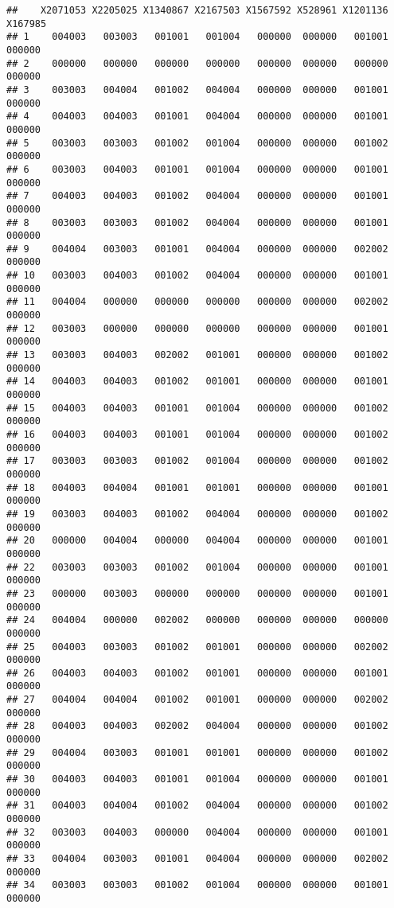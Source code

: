 \documentclass[
]{article}
\begin{document}
\begin{verbatim}
##    X2071053 X2205025 X1340867 X2167503 X1567592 X528961 X1201136 X167985
## 1    004003   003003   001001   001004   000000  000000   001001  000000
## 2    000000   000000   000000   000000   000000  000000   000000  000000
## 3    003003   004004   001002   004004   000000  000000   001001  000000
## 4    004003   004003   001001   004004   000000  000000   001001  000000
## 5    003003   003003   001002   001004   000000  000000   001002  000000
## 6    003003   004003   001001   001004   000000  000000   001001  000000
## 7    004003   004003   001002   004004   000000  000000   001001  000000
## 8    003003   003003   001002   004004   000000  000000   001001  000000
## 9    004004   003003   001001   004004   000000  000000   002002  000000
## 10   003003   004003   001002   004004   000000  000000   001001  000000
## 11   004004   000000   000000   000000   000000  000000   002002  000000
## 12   003003   000000   000000   000000   000000  000000   001001  000000
## 13   003003   004003   002002   001001   000000  000000   001002  000000
## 14   004003   004003   001002   001001   000000  000000   001001  000000
## 15   004003   004003   001001   001004   000000  000000   001002  000000
## 16   004003   004003   001001   001004   000000  000000   001002  000000
## 17   003003   003003   001002   001004   000000  000000   001002  000000
## 18   004003   004004   001001   001001   000000  000000   001001  000000
## 19   003003   004003   001002   004004   000000  000000   001002  000000
## 20   000000   004004   000000   004004   000000  000000   001001  000000
## 22   003003   003003   001002   001004   000000  000000   001001  000000
## 23   000000   003003   000000   000000   000000  000000   001001  000000
## 24   004004   000000   002002   000000   000000  000000   000000  000000
## 25   004003   003003   001002   001001   000000  000000   002002  000000
## 26   004003   004003   001002   001001   000000  000000   001001  000000
## 27   004004   004004   001002   001001   000000  000000   002002  000000
## 28   004003   004003   002002   004004   000000  000000   001002  000000
## 29   004004   003003   001001   001001   000000  000000   001002  000000
## 30   004003   004003   001001   001004   000000  000000   001001  000000
## 31   004003   004004   001002   004004   000000  000000   001002  000000
## 32   003003   004003   000000   004004   000000  000000   001001  000000
## 33   004004   003003   001001   004004   000000  000000   002002  000000
## 34   003003   003003   001002   001004   000000  000000   001001  000000

\end{verbatim}
\end{document}
